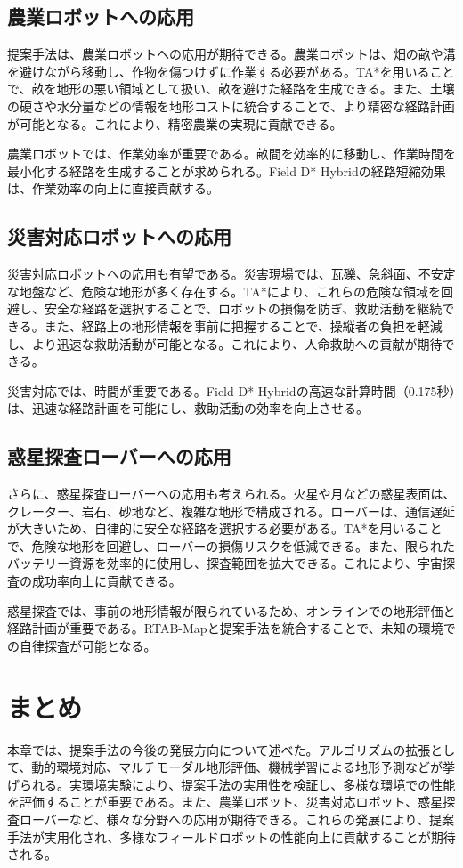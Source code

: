 \subsection{農業ロボットへの応用}

提案手法は、農業ロボットへの応用が期待できる。農業ロボットは、畑の畝や溝を避けながら移動し、作物を傷つけずに作業する必要がある。TA*を用いることで、畝を地形の悪い領域として扱い、畝を避けた経路を生成できる。また、土壌の硬さや水分量などの情報を地形コストに統合することで、より精密な経路計画が可能となる。これにより、精密農業の実現に貢献できる。

農業ロボットでは、作業効率が重要である。畝間を効率的に移動し、作業時間を最小化する経路を生成することが求められる。Field D* Hybridの経路短縮効果は、作業効率の向上に直接貢献する。

\subsection{災害対応ロボットへの応用}

災害対応ロボットへの応用も有望である。災害現場では、瓦礫、急斜面、不安定な地盤など、危険な地形が多く存在する。TA*により、これらの危険な領域を回避し、安全な経路を選択することで、ロボットの損傷を防ぎ、救助活動を継続できる。また、経路上の地形情報を事前に把握することで、操縦者の負担を軽減し、より迅速な救助活動が可能となる。これにより、人命救助への貢献が期待できる。

災害対応では、時間が重要である。Field D* Hybridの高速な計算時間（0.175秒）は、迅速な経路計画を可能にし、救助活動の効率を向上させる。

\subsection{惑星探査ローバーへの応用}

さらに、惑星探査ローバーへの応用も考えられる。火星や月などの惑星表面は、クレーター、岩石、砂地など、複雑な地形で構成される。ローバーは、通信遅延が大きいため、自律的に安全な経路を選択する必要がある。TA*を用いることで、危険な地形を回避し、ローバーの損傷リスクを低減できる。また、限られたバッテリー資源を効率的に使用し、探査範囲を拡大できる。これにより、宇宙探査の成功率向上に貢献できる。

惑星探査では、事前の地形情報が限られているため、オンラインでの地形評価と経路計画が重要である。RTAB-Mapと提案手法を統合することで、未知の環境での自律探査が可能となる。

\section{まとめ}

本章では、提案手法の今後の発展方向について述べた。アルゴリズムの拡張として、動的環境対応、マルチモーダル地形評価、機械学習による地形予測などが挙げられる。実環境実験により、提案手法の実用性を検証し、多様な環境での性能を評価することが重要である。また、農業ロボット、災害対応ロボット、惑星探査ローバーなど、様々な分野への応用が期待できる。これらの発展により、提案手法が実用化され、多様なフィールドロボットの性能向上に貢献することが期待される。
